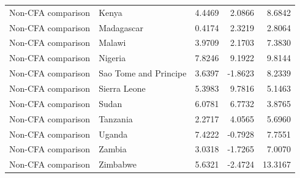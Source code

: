 \begin{table}
\begin{tabular}[t]{llrrr}
Non-CFA comparison & Kenya & 4.4469 & 2.0866 & 8.6842\\
\addlinespace
Non-CFA comparison & Madagascar & 0.4174 & 2.3219 & 2.8064\\
Non-CFA comparison & Malawi & 3.9709 & 2.1703 & 7.3830\\
Non-CFA comparison & Nigeria & 7.8246 & 9.1922 & 9.8144\\
Non-CFA comparison & Sao Tome and Principe & 3.6397 & -1.8623 & 8.2339\\
Non-CFA comparison & Sierra Leone & 5.3983 & 9.7816 & 5.1463\\
\addlinespace
Non-CFA comparison & Sudan & 6.0781 & 6.7732 & 3.8765\\
Non-CFA comparison & Tanzania & 2.2717 & 4.0565 & 5.6960\\
Non-CFA comparison & Uganda & 7.4222 & -0.7928 & 7.7551\\
Non-CFA comparison & Zambia & 3.0318 & -1.7265 & 7.0070\\
Non-CFA comparison & Zimbabwe & 5.6321 & -2.4724 & 13.3167\\
\bottomrule
\end{tabular}
\end{table}